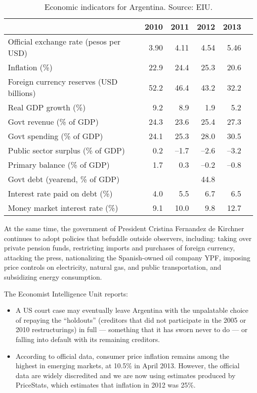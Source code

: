 \begin{enumerate}
\begin{table}[h]
\centering
\tabcolsep=0.06in
\begin{tabular}{lrrrrr}
\toprule
                & 2010 & 2011 & 2012 & 2013 \\
\midrule
Official exchange rate (pesos per USD)  & 3.90 & 4.11 & 4.54 & 5.46  \\
Inflation (\%)              & 22.9 & 24.4 & 25.3 & 20.6 \\
Foreign currency reserves (USD billions) & 52.2 & 46.4 & 43.2 & 32.2 \\
Real GDP growth (\%)        & 9.2 & 8.9 & 1.9 & 5.2  \\
Govt revenue (\% of GDP)    & 24.3 & 23.6 & 25.4 & 27.3 \\
Govt spending (\% of GDP)   & 24.1 & 25.3 & 28.0 & 30.5  \\
Public sector surplus (\% of GDP) & 0.2 & --1.7 & --2.6 & --3.2 \\
Primary balance (\% of GDP) &  1.7 & 0.3 & --0.2 & --0.8   \\
Govt debt (yearend, \% of GDP)  & & & 44.8\\
Interest rate paid on debt (\%) & 4.0 & 5.5 & 6.7 & 6.5  \\
Money market interest rate (\%) & 9.1 & 10.0 & 9.8 & 12.7 \\
\bottomrule
\end{tabular}
\caption{Economic indicators for Argentina.  Source:  EIU.}
\label{tab:argentina}
\end{table}


At the same time, the government of President Cristina Fernandez de Kirchner
continues to adopt policies that befuddle outside observers, including:
taking over private pension funds,
restricting imports and purchases of foreign currency,
attacking the press,
nationalizing the Spanish-owned oil company YPF,
imposing price controls on electricity, natural gas, and public transportation,
and subsidizing energy consumption.

The Economist Intelligence Unit reports:
\begin{itemize}
\item A US court case may eventually leave
Argentina with the unpalatable choice of repaying the ``holdouts'' (creditors that
did not participate in the 2005 or 2010 restructurings) in full --- something that it
has sworn never to do --- or falling into default with its remaining creditors.

\item According to official data, consumer price inflation remains among the highest
in emerging markets, at 10.5\% in April 2013. However, the official data are
widely discredited and we are now using estimates produced by PriceStats,
which estimates that inflation in 2012 was 25\%.


\end{itemize}
\end{enumerate}

